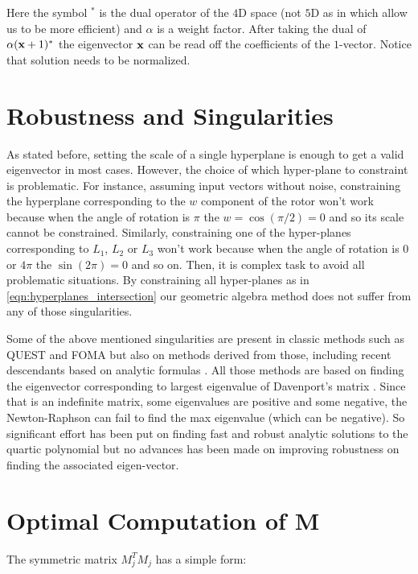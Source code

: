 \documentclass{birkjour}
\numberwithin{equation}{section}
\begin{document}
Here the symbol $^*$ is the dual operator of the $4$D space (not $5$D as in \cite{DeKeninck2019} which allow us to be more efficient) and $\alpha$ is a weight factor. After taking the dual of $\alpha (\textbf x + 1)^*$ the eigenvector $\textbf x$ can be read off the coefficients of the $1$-vector. Notice that solution needs to be normalized.


\section{Robustness and Singularities}
\label{section:robustness}

As stated before, setting the scale of a single hyperplane is enough to get a valid eigenvector in most cases. However, the choice of which hyper-plane to constraint is problematic. For instance,  assuming input vectors without noise, constraining the hyperplane corresponding to the $w$ component of the rotor won't work because when the angle of rotation is $\pi$ the $w = \cos(\pi/2) = 0$ and so its scale cannot be constrained. Similarly, constraining one of the hyper-planes corresponding to $L_1$, $L_2$ or $L_3$ won't work because when the angle of rotation is $0$ or $4 \pi$ the $\sin(2 \pi) = 0$ and so on. Then, it is complex task to avoid all problematic situations. By constraining all hyper-planes as in \ref{eqn:hyperplanes_intersection} our geometric algebra method does not suffer from any of those singularities.

Some of the above mentioned singularities are present in classic methods such as QUEST \cite{Shuster1981} and FOMA \cite{Markley1993} but also on methods derived from those, including recent descendants based on analytic formulas \cite{Yang2013, Wu2016, Wu2017, Wu2018FA3R, Wu2018FS3R}. All those methods are based on finding the eigenvector corresponding to largest eigenvalue of Davenport's matrix \cite{Davenport1968}. Since that is an indefinite matrix, some eigenvalues are positive and some negative, the Newton-Raphson can fail to find the max eigenvalue (which can be negative). So significant effort has been put on finding fast and robust analytic solutions to the quartic polynomial but no advances has been made on improving robustness on finding the associated eigen-vector.

\section{Optimal Computation of M}

The symmetric matrix $M_j^T M_j$ has a simple form:
\end{document}

